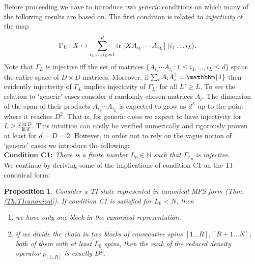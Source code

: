 \documentclass[aps,prl,epsfig,graphics,floatfix,mathbbm,a4paper]{article}
\newtheorem{prop}{\indent Proposition}
\newcommand{\1}{\mathbbm{1}}
\renewcommand{\>}{\rangle}
\newcommand{\<}{\langle}
\begin{document}
Before proceeding we have to introduce two \emph{generic}
conditions on which many of the following results are based on.
The first condition is related to \emph{injectivity} of the map
\begin{equation}\label{eq:injectivity}
    \Gamma_L:X\mapsto\sum_{i_1,\ldots,i_L=1}^d
    \operatorname{tr}\big[XA_{i_1}\cdots A_{i_L}\big]\;|i_1\ldots i_L\rangle.
\end{equation}
Note that $\Gamma_L$ is injective iff the set of matrices
$\{A_{i_1}\cdots A_{i_L}: 1 \le i_1,\ldots,i_L\le d\}$ spans the
entire space of $D\times D$ matrices. Moreover, if $\sum_i
    A_iA_i^\dagger=\mathbbm{1}$ then evidently injectivity of
$\Gamma_L$ implies injectivity of $\Gamma_{L'}$ for all $L'\geq
    L$. To see the relation to `generic' cases consider $d$ randomly
chosen matrices $A_i$. The dimension of the span of their products
$A_{i_1}\cdots A_{i_L}$ is expected to grow as $d^L$ up to the
point where it reaches $D^2$. That is, for generic cases we expect
to have injectivity for $L\geq\frac{2\ln D}{\ln d}$. This
intuition can easily be verified numerically and rigorously proven
at least for $d=D=2$. However, in order not to rely on the vague
notion of `generic' cases we
introduce the following:\vspace{3pt}\\
{\bf Condition C1:} \emph{There is a finite number
    $L_0\in\mathbb{N}$ such that $\Gamma_{L_0}$ is injective.\vspace{3pt}}\\
We continue by deriving some of the implications of condition C1
on the TI canonical form:
\begin{prop}\label{prop-inj} Consider a TI state represented in canonical MPS form (Thm.\ref{Th:TIcanonical}). If condition C1 is satisfied for $L_0<N$, then
    \begin{enumerate}
        \item we have only one block in the canonical representation.
        \item if we divide the chain in two blocks of consecutive spins
              $[1\ldots R],[R+1\ldots N]$, both of them with at least $L_0$
              spins, then the rank of the reduced density operator
              $\rho_{[1..R]}$ is exactly $D^2$.
    \end{enumerate}
\end{prop}
\end{document}
